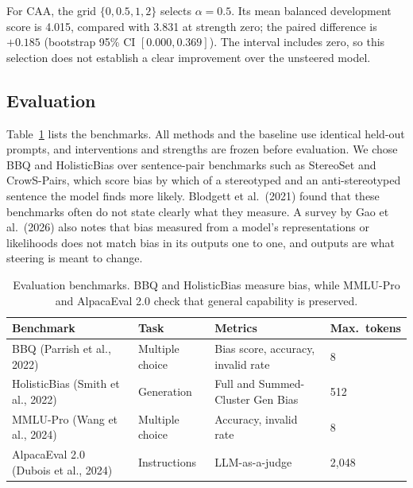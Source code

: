 \documentclass{article}
\begin{document}
For CAA, the grid $\{0, 0.5, 1, 2\}$ selects $\alpha=0.5$. Its mean balanced development score is 4.015, compared with 3.831 at strength zero; the paired difference is $+0.185$ (bootstrap 95\% CI $[0.000, 0.369]$). The interval includes zero, so this selection does not establish a clear improvement over the unsteered model.

\subsection{Evaluation}

Table~\ref{tab:benchmarks} lists the benchmarks. All methods and the baseline use identical held-out prompts, and interventions and strengths are frozen before evaluation. We chose BBQ and HolisticBias over sentence-pair benchmarks such as StereoSet and CrowS-Pairs, which score bias by which of a stereotyped and an anti-stereotyped sentence the model finds more likely. Blodgett et al.\ (2021) found that these benchmarks often do not state clearly what they measure. A survey by Gao et al.\ (2026) also notes that bias measured from a model's representations or likelihoods does not match bias in its outputs one to one, and outputs are what steering is meant to change.

\begin{table}[h]
  \caption{Evaluation benchmarks. BBQ and HolisticBias measure bias, while MMLU-Pro and AlpacaEval 2.0 check that general capability is preserved.}
  \label{tab:benchmarks}
  \centering
  \small
  \setlength{\tabcolsep}{4pt}
  \begin{tabular}{llll}
    \toprule
    Benchmark & Task & Metrics & Max.\ tokens \\
    \midrule
    BBQ (Parrish et al., 2022) & Multiple choice & Bias score, accuracy, invalid rate & 8 \\
    HolisticBias (Smith et al., 2022) & Generation & Full and Summed-Cluster Gen Bias & 512 \\
    MMLU-Pro (Wang et al., 2024) & Multiple choice & Accuracy, invalid rate & 8 \\
    AlpacaEval 2.0 (Dubois et al., 2024) & Instructions & LLM-as-a-judge & 2,048 \\
    \bottomrule
  \end{tabular}
\end{table}
\end{document}

